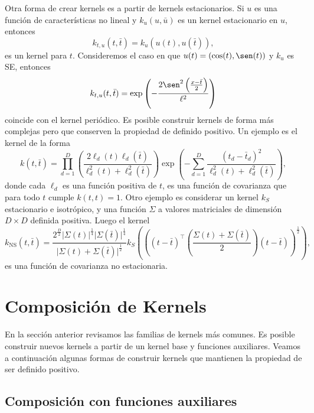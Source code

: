 Otra forma de crear kernels es a partir de kernels estacionarios. Si \(u\) es una función de características no lineal y \(k_{u}(u, \bar{u})\) es un kernel estacionario en \(u\), entonces
\begin{equation*}
	k_{t, u}(t, \bar{t}) = k_{u}(u(t), u(\bar{t})),
\end{equation*}
es un kernel para \(t\). Consideremos el caso en que \(u(t) = (\cos(t), \sen(t))\) y \(k_{u}\) es SE, entonces
\begin{equation*}
	k_{t, u}(t, \bar{t}) = \exp \left(-\frac{2\sen^{2}\left(\frac{x-\bar{t}}{2}\right)}{\ell^{2}}\right)
\end{equation*}
coincide con el kernel periódico. Es posible construir kernels de forma más complejas pero que conserven la propiedad de definido positivo. Un ejemplo es el kernel de la forma
\begin{equation*}
	k(t, \bar{t}) = \prod_{d=1}^{D} \left(\frac{2\ell_{d}(t) \ell_{d}(\bar{t})}{\ell_{d}^{2}(t) + \ell_{d}^{2}(\bar{t})}\right) \exp\left(-\sum_{d=1}^{D} \frac{(t_{d}-\bar{t}_{d})^{2}}{\ell_{d}^{2}(t) + \ell_{d}^{2}(\bar{t})}\right),
\end{equation*}
donde cada \(\ell_{d}\) es una función positiva de \(t\), es una función de covarianza que para todo \(t\) cumple \(k(t, t) = 1\). Otro ejemplo es considerar un kernel \(k_{S}\) estacionario e isotrópico, y una función \(\Sigma\) a valores matriciales de dimensión \(D \times D\) definida positiva. Luego el kernel
\begin{equation*}
	k_{\mathrm{NS}}(t, \bar{t}) = \frac{2^{\frac{D}{2}} \vert \Sigma(t) \vert^{\frac{1}{4}} \vert \Sigma(\bar{t}) \vert^{\frac{1}{4}}}{\vert \Sigma(t) + \Sigma(\bar{t}) \vert^{\frac{1}{2}}} k_{S}\left(\left((t-\bar{t})^{\top} \left(\frac{\Sigma(t) + \Sigma(\bar{t})}{2}\right) (t-\bar{t})\right)^{\frac{1}{2}}\right),
\end{equation*}
es una función de covarianza no estacionaria.


\section{Composición de Kernels}

En la sección anterior revisamos las familias de kernels más comunes. Es posible construir nuevos kernels a partir de un kernel base y funciones auxiliares. Veamos a continuación algunas formas de construir kernels que mantienen la propiedad de ser definido positivo.

\subsection{Composición con funciones auxiliares}

